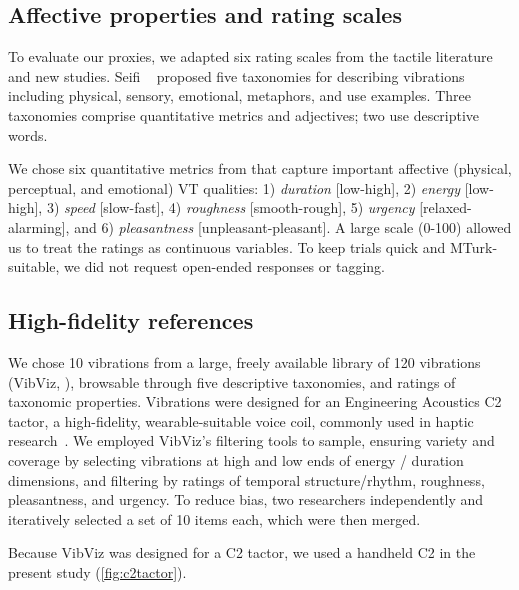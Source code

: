 \subsection{Affective properties and rating scales} 
To evaluate our proxies, we adapted six rating scales from the tactile literature and new studies.
%
Seifi \etal~\cite{Seifi2015} proposed five taxonomies for describing vibrations including  physical, sensory, emotional, metaphors, and use examples.
Three taxonomies comprise quantitative metrics and adjectives; two use descriptive words. 

We chose six quantitative metrics from \cite{Seifi2015} that capture important affective (physical, perceptual, and %
emotional) VT qualities:
 1) \textit{duration} [low-high], 
 2) \textit{energy} [low-high], 
 3) \textit{speed} [slow-fast], 
 4) \textit{roughness} [smooth-rough], 
 5) \textit{urgency} [relaxed-alarming], and 
 6) \textit{pleasantness} [unpleasant-pleasant].
A large scale (0-100) 
allowed us to treat the ratings as continuous variables.
To keep trials quick and MTurk-suitable,
we did not request open-ended responses or tagging. %


\subsection{High-fidelity references}
We chose 10 vibrations from a large, freely available library of 120 vibrations (VibViz, \cite{Seifi2015}), browsable through five descriptive taxonomies, and ratings of taxonomic properties. Vibrations were designed for an Engineering Acoustics C2 tactor, a high-fidelity, wearable-suitable voice coil, commonly used in haptic research~\cite{Seifi2015}.
We employed VibViz's filtering tools to sample, ensuring variety and coverage by selecting vibrations at  high and low ends of energy / duration dimensions, and filtering by ratings of temporal structure/rhythm, roughness, pleasantness, and urgency.
To reduce bias, two researchers independently and iteratively selected a set of 10 items each, which were then merged.

Because VibViz was designed for a C2 tactor, we used a handheld C2 in the present study (\autoref{fig:c2tactor}).

